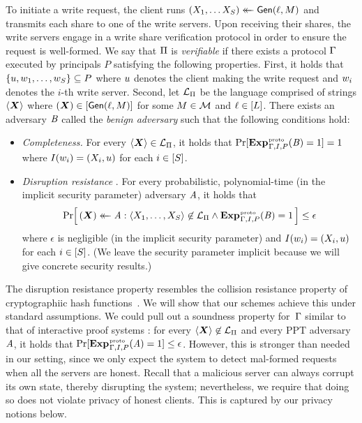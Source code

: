 To initiate a write request, the client runs $(X_1, \ldots X_S) \mathrel{\leftarrow\mkern-14mu\leftarrow}
\mathsf{Gen}(\ell,M)$ and transmits each share to one of the write servers. Upon
receiving their shares, the write servers engage in a write share verification
protocol in order to ensure the request is well-formed.  We say that $\mathrm{\Pi}$ is
\emph{verifiable} if there exists a protocol $\mathrm{\Gamma}$ executed by principals
$P$ satisfying the following properties.
%
First, it holds that $\{u, w_1, \ldots, w_{S}\}
\subseteq P$ where $u$ denotes the client making the write request and
$w_i$ denotes the $i$-th write server.
%
Second, let $\mathcal{L}_{\mathrm{\Pi}}$ be the language comprised of strings $\str(\shares)$
where $(\shares) \in [\gen(\idx, \msg)]$ for some $M \in \mathcal{M}$ and $\ell
\in [L]$. There exists an adversary $\mathit{B}$ called the \textit{benign adversary}
such that the following conditions hold:
\begin{itemize}
  \item \textit{Completeness.}
    For every $\str(\shares) \in \lang_\dpf$, it holds that
    $
      \Pr[\game{proto}_{\reqvfy,I,P}(\advB) \outputs \accept] = 1
    $
  where $I(w_i) = (X_i, u)$ for each $i\in[S]$.
  \item \textit{Disruption resistance} \cite[def. 3]{riposte}.
    For every probabilistic, polynomial-time (in the implicit security
    parameter) adversary $\mathit{A}$, it holds that
    \[
      \Prob{ (\shares) \getsr \advA:
             \str(X_1, \ldots, X_\sharect) \not\in \lang_\dpf \AND
             \game{proto}_{\reqvfy,I,P}(\advB) \outputs \accept } \le \epsilon
    \]
    where $\epsilon$ is negligible (in the implicit security parameter) and
    $I(w_i) = (X_i, u)$ for each $i\in[S]$. (We leave the
    security parameter implicit because we will give concrete security results.)
\end{itemize}

The disruption resistance property resembles the collision resistance property
of cryptographiic hash functions~\cite{collision-resistance}. We will show that
our schemes achieve this under standard assumptions.
%
We could pull out a soundness property for~$\mathrm{\Gamma}$ similar to
that of interactive proof systems \cite[def. 4.2.10]{oded}: for every
$\str(\shares) \not\in \lang_\dpf$ and every PPT adversary~$\mathit{A}$, it
holds that $\Pr[\game{proto}_{\reqvfy,I,P}(\advA) = 1] \le \epsilon$.
%
However, this is stronger than needed in our setting, since we only expect the
system to detect mal-formed requests when all the servers are honest.  Recall
that a malicious server can always corrupt its own state, thereby disrupting the
system; nevertheless, we require that doing so does not violate privacy of
honest clients. This is captured by our privacy notions below.


